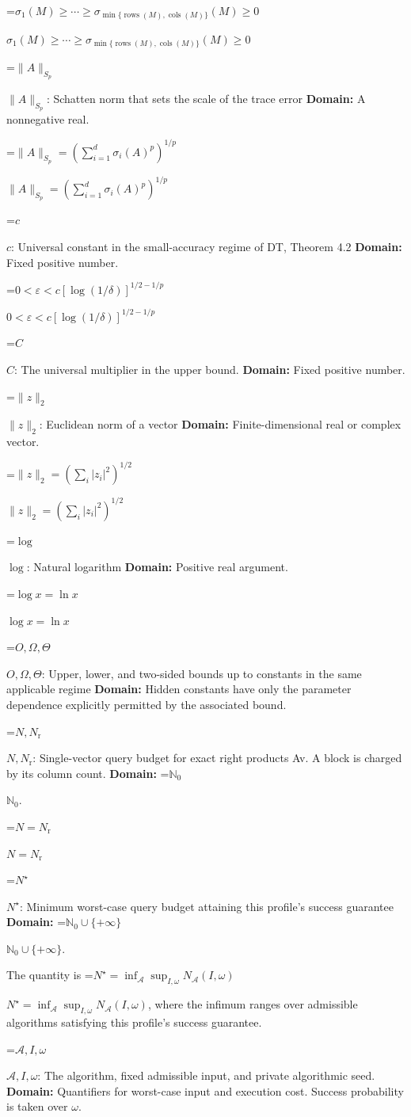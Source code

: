\documentclass[10pt,a4paper]{article}
\newcommand{\AtlasMath}[1]{\par\begingroup\centering\setbox0=\hbox{$\displaystyle #1$}\ifdim\wd0>1.4\linewidth\typeout{ATLAS WIDE FORMULA: \the\wd0}\fi\ifdim\wd0>\linewidth\resizebox{\linewidth}{!}{\box0}\else\box0\fi\par\endgroup}
\newcommand{\AtlasInlineMath}[1]{\begingroup\setbox0=\hbox{$#1$}\ifdim\wd0>.4\linewidth\endgroup\AtlasMath{#1}\else\endgroup$#1$\fi}
\begin{document}
\AtlasInlineMath{\sigma_1(M)\ge\cdots\ge\sigma_{\min\{\operatorname{rows}(M),\operatorname{cols}(M)\}}(M)\ge0}

\AtlasInlineMath{\|A\|_{S_p}}: Schatten norm that sets the scale of the trace error \textbf{Domain:} A nonnegative real.

\AtlasInlineMath{\|A\|_{S_p}=(\sum_{i=1}^d\sigma_i(A)^p)^{1/p}}

\AtlasInlineMath{c}: Universal constant in the small-accuracy regime of DT, Theorem 4.2 \textbf{Domain:} Fixed positive number.

\AtlasInlineMath{0<\varepsilon<c[\log(1/\delta)]^{1/2-1/p}}

\AtlasInlineMath{C}: The universal multiplier in the upper bound. \textbf{Domain:} Fixed positive number.

\AtlasInlineMath{\|z\|_2}: Euclidean norm of a vector \textbf{Domain:} Finite-dimensional real or complex vector.

\AtlasInlineMath{\|z\|_2=(\sum_i|z_i|^2)^{1/2}}

\AtlasInlineMath{\log}: Natural logarithm \textbf{Domain:} Positive real argument.

\AtlasInlineMath{\log x=\ln x}

\AtlasInlineMath{O,\Omega,\Theta}: Upper, lower, and two-sided bounds up to constants in the same applicable regime \textbf{Domain:} Hidden constants have only the parameter dependence explicitly permitted by the associated bound.

\AtlasInlineMath{N,N_{\mathrm r}}: Single-vector query budget for exact right products Av. A block is charged by its column count. \textbf{Domain:} \AtlasInlineMath{\mathbb N_0}.

\AtlasInlineMath{N=N_{\mathrm r}}

\AtlasInlineMath{N^\star}: Minimum worst-case query budget attaining this profile's success guarantee \textbf{Domain:} \AtlasInlineMath{\mathbb N_0\cup\{+\infty\}}.

The quantity is \AtlasInlineMath{N^\star=\inf_{\mathcal A}\sup_{I,\omega}N_{\mathcal A}(I,\omega)}, where the infimum ranges over admissible algorithms satisfying this profile's success guarantee.

\AtlasInlineMath{\mathcal A,I,\omega}: The algorithm, fixed admissible input, and private algorithmic seed. \textbf{Domain:} Quantifiers for worst-case input and execution cost. Success probability is taken over $\omega$.
\end{document}
